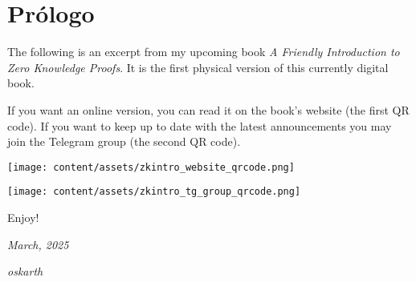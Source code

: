 \section*{Prólogo}
\vspace{0.5cm}


The following is an excerpt from my upcoming book \textit{A Friendly Introduction to Zero Knowledge Proofs}. 
It is the first physical version of this currently digital book.

If you want an online version, you can read it on the book's website (the first QR code).
If you want to keep up to date with the latest announcements you may join the Telegram group (the second QR code).

\vspace{1cm}

\begin{center}
\texttt{[image: content/assets/zkintro\_website\_qrcode.png]}
\end{center}

\vspace{0.5cm}

\begin{center}
\texttt{[image: content/assets/zkintro\_tg\_group\_qrcode.png]}
\end{center}

\vspace{0.5cm}

Enjoy!

\textit{March, 2025}

\textit{oskarth}

\thispagestyle{empty}
